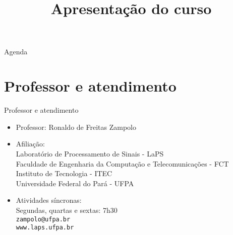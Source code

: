 


\title{\cursogrande\\ \vspace{1cm}Apresentação do curso}


   \maketitle[randomdots={false}]
   \begin{slide}{Agenda}
      \tableofcontents[content=sections]
   \end{slide}

   \section[ slide = true]{Professor e atendimento}
      \begin{slide}[toc=]{Professor e atendimento}
         \begin{itemize}[type=1]
            \item Professor: Ronaldo de Freitas Zampolo 
            \item Afiliação:\\
                  Laboratório de Processamento de Sinais - LaPS\\
                  Faculdade de Engenharia da Computação e Telecomunicações - FCT\\
                  Instituto de Tecnologia - ITEC\\
                  Universidade Federal do Pará - UFPA
            \item Atividades síncronas:\\
                  Segundas, quartas e sextas: 7h30\\
                  \texttt{zampolo@ufpa.br}\\ 
                  \texttt{www.laps.ufpa.br}
         \end{itemize}
      \end{slide}

